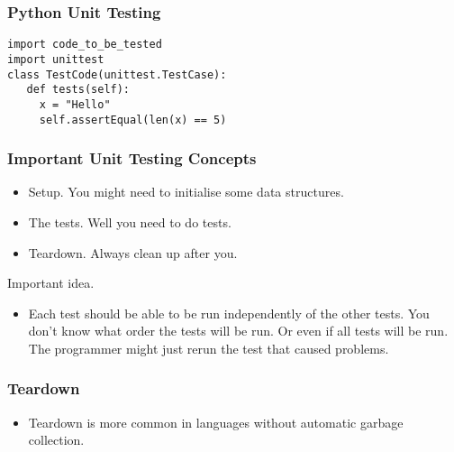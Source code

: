 \documentclass{beamer}
\begin{document}
\begin{frame}[fragile]
  \frametitle{Python Unit Testing}
\begin{lstlisting}
import code_to_be_tested
import unittest
class TestCode(unittest.TestCase):
   def tests(self):
     x = "Hello"
     self.assertEqual(len(x) == 5)
\end{lstlisting}
\end{frame} 
\begin{frame}
  \frametitle{Important Unit Testing Concepts}
  \begin{itemize}
  \item Setup. You might need to initialise some data structures.  \pause
  \item The tests. Well you need to do tests. \pause
  \item Teardown. Always clean up after you. \pause
  \end{itemize}
Important idea.
\begin{itemize}
\item Each test should be able to be run independently of the other
  tests. You don't know what order the tests will be run. Or even if
  all tests will be run. The programmer might just rerun the test that
  caused problems. 
\end{itemize}
\end{frame}
\begin{frame}
  \frametitle{Teardown}
  \begin{itemize}
  \item Teardown is more common in languages without automatic garbage
    collection. 
  \end{itemize}
\end{frame}
\end{document}
